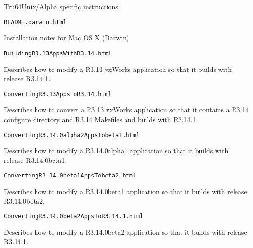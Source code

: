 \begin{description}\item Tru64Unix/Alpha specific instructions

\end{description}\begin{verbatim}README.darwin.html
\end{verbatim}\begin{description}\item Installation notes for Mac OS X (Darwin)

\end{description}\begin{verbatim}BuildingR3.13AppsWithR3.14.html
\end{verbatim}\begin{description}\item Describes how to modify a R3.13 vxWorks application so that it builds with release R3.14.1.

\end{description}\begin{verbatim}ConvertingR3.13AppsToR3.14.html
\end{verbatim}\begin{description}\item Describes how to convert a R3.13 vxWorks application so that it contains a R3.14 configure directory and R3.14 
Makefiles and builds with R3.14.1.

\end{description}\begin{verbatim}ConvertingR3.14.0alpha2AppsTobeta1.html
\end{verbatim}\begin{description}\item Describes how to modify a R3.14.0alpha1 application so that it builds with release R3.14.0beta1.

\end{description}\begin{verbatim}ConvertingR3.14.0beta1AppsTobeta2.html
\end{verbatim}\begin{description}\item Describes how to modify a R3.14.0beta1 application so that it builds with release R3.14.0beta2.

\end{description}\begin{verbatim}ConvertingR3.14.0beta2AppsToR3.14.1.html
\end{verbatim}\begin{description}\item Describes how to modify a R3.14.0beta2 application so that it builds with release R3.14.1.


\end{description}
